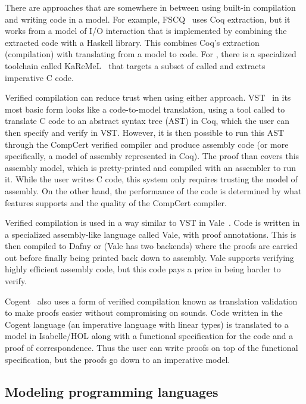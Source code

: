 There are approaches that are somewhere in between using built-in compilation
and writing code in a model. For example, FSCQ~\cite{chen:fscq} uses Coq
extraction, but it works from a model of I/O interaction that is implemented by
combining the extracted code with a Haskell library. This combines Coq's
extraction (compilation) with translating from a model to code. For \fstar,
there is a specialized toolchain called KaReMeL~\cite{protzenko:lowstar} that
targets a subset of \fstar called \lowstar and extracts imperative C code.

Verified compilation can reduce trust when using either approach.
VST~\cite{cao:vst-floyd} in its most basic form looks like a code-to-model
translation, using a tool called  to translate C code to an
abstract syntax tree (AST) in Coq, which the user can then specify and verify in
VST. However, it is then possible to run this AST through the CompCert verified
compiler and produce assembly code (or more specifically, a model of assembly
represented in Coq). The proof than covers this assembly model, which is
pretty-printed and compiled with an assembler to run it. While the user writes C
code, this system only requires trusting the model of assembly. On the other
hand, the performance of the code is determined by what features 
supports and the quality of the CompCert compiler.

Verified compilation is used in a way similar to VST in
Vale~\cite{bond:vale,fromherz:vale-fstar}. Code is written in a specialized
assembly-like language called Vale, with proof annotations. This is then
compiled to Dafny or \fstar (Vale has two backends) where the proofs are carried
out before finally being printed back down to assembly. Vale supports verifying highly
efficient assembly code, but this code pays a price in being harder to verify.

Cogent~\cite{amani:cogent,oconnor:cogent-lang} also uses a form of verified
compilation known as translation validation to make proofs easier without compromising on sounds. Code
written in the Cogent language (an imperative language with linear types) is
translated to a model in Isabelle/HOL along with a functional specification for
the code and a proof of correspondence. Thus the user can write proofs on top of
the functional specification, but the proofs go down to an imperative model.

\subsection{Modeling programming languages}

